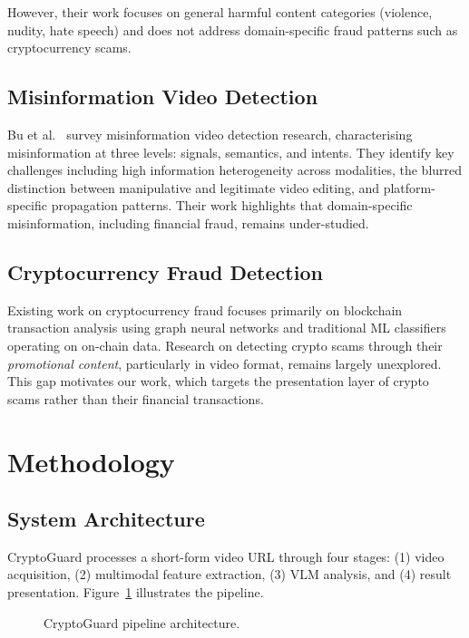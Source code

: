 \documentclass[12pt,a4paper]{article}
\begin{document}
However, their work focuses on general harmful content categories
(violence, nudity, hate speech) and does not address domain-specific
fraud patterns such as cryptocurrency scams.

\subsection{Misinformation Video Detection}

Bu et al.~\cite{bu2023misinformation} survey misinformation video
detection research, characterising misinformation at three levels:
signals, semantics, and intents. They identify key challenges including
high information heterogeneity across modalities, the blurred distinction
between manipulative and legitimate video editing, and platform-specific
propagation patterns. Their work highlights that domain-specific
misinformation, including financial fraud, remains under-studied.

\subsection{Cryptocurrency Fraud Detection}

Existing work on cryptocurrency fraud focuses primarily on blockchain
transaction analysis using graph neural networks and traditional ML
classifiers operating on on-chain data. Research on detecting crypto
scams through their \emph{promotional content}, particularly in video
format, remains largely unexplored. This gap motivates our work, which
targets the presentation layer of crypto scams rather than their
financial transactions.

\section{Methodology}

\subsection{System Architecture}

CryptoGuard processes a short-form video URL through four stages:
(1) video acquisition, (2) multimodal feature extraction, (3) VLM
analysis, and (4) result presentation. Figure~\ref{fig:architecture}
illustrates the pipeline.

\begin{figure}[h]
\centering
{}
\caption{CryptoGuard pipeline architecture.}
\label{fig:architecture}
\end{figure}
\end{document}
